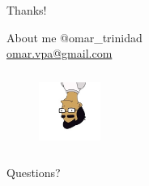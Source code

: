 \documentclass{beamer}
\begin{document}
\begin{frame}{Thanks!}
  \begin{block}{About me}
   @omar\_trinidad \\
   \url{omar.vpa@gmail.com}
  \end{block}
  \begin{figure}
    \centering
     \includegraphics[width = 2cm, height = 2.5cm]{./omar_simpson_version.jpg}
  \end{figure}
  \begin{block}{}
   Questions?
  \end{block}

\end{frame}
\end{document}
